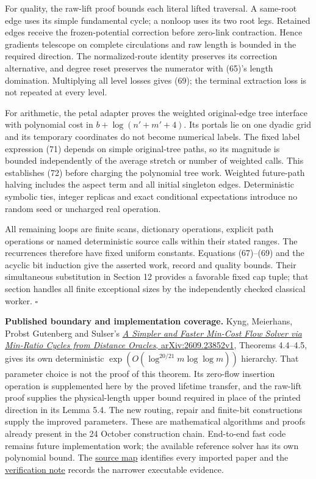 For quality, the raw-lift proof bounds each literal lifted traversal. A same-root edge uses its simple fundamental cycle; a nonloop uses its two root legs. Retained edges receive the frozen-potential correction before zero-link contraction. Hence gradients telescope on complete circulations and raw length is bounded in the required direction. The normalized-route identity preserves its correction alternative, and degree reset preserves the numerator with (65)'s length domination. Multiplying all level losses gives (69); the terminal extraction loss is not repeated at every level.

For arithmetic, the petal adapter proves the weighted original-edge tree interface with polynomial cost in \(b+\log(n'+m'+4)\). Its portals lie on one dyadic grid and its temporary coordinates do not become numerical labels. The fixed label expression (71) depends on simple original-tree paths, so its magnitude is bounded independently of the average stretch or number of weighted calls. This establishes (72) before charging the polynomial tree work. Weighted future-path halving includes the aspect term and all initial singleton edges. Deterministic symbolic ties, integer replicas and exact conditional expectations introduce no random seed or uncharged real operation.

All remaining loops are finite scans, dictionary operations, explicit path operations or named deterministic source calls within their stated ranges. The recurrences therefore have fixed uniform constants. Equations (67)--(69) and the acyclic bit induction give the asserted work, record and quality bounds. Their simultaneous substitution in Section 12 provides a favorable fixed cap tuple; that section handles all finite exceptional sizes by the independently checked classical worker. \hfill\(\square\)

\textbf{Published boundary and implementation coverage.} Kyng, Meierhans, Probst Gutenberg and Sulser's \href{https://arxiv.org/html/2609.23852v1}{\emph{A Simpler and Faster Min-Cost Flow Solver via Min-Ratio Cycles from Distance Oracles}, arXiv:2609.23852v1}, Theorems 4.4--4.5, gives its own deterministic \(\exp(O(\log^{20/21}m\log\log m))\) hierarchy. That parameter choice is not the proof of this theorem. Its zero-flow insertion operation is supplemented here by the proved lifetime transfer, and the raw-lift proof supplies the physical-length upper bound required in place of the printed direction in its Lemma 5.4. The new routing, repair and finite-bit constructions supply the improved parameters. These are mathematical algorithms and proofs already present in the 24 October construction chain. End-to-end fast code remains future implementation work; the available reference solver has its own polynomial bound. The \href{https://github.com/icekylinx/algorithm-frontier/blob/main/problems/general-matching/sources.md}{source map} identifies every imported paper and the \href{https://github.com/icekylinx/algorithm-frontier/blob/main/problems/general-matching/verify/README.md}{verification note} records the narrower executable evidence.

